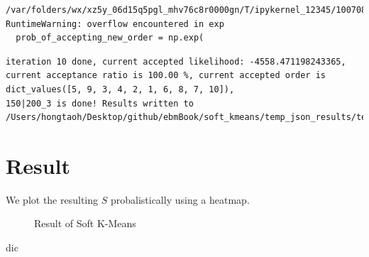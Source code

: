 \documentclass[
  letterpaper,
  DIV=11,
  numbers=noendperiod]{scrreprt}
\newenvironment{Shaded}{\begin{snugshade}}{\end{snugshade}}
\newcommand{\NormalTok}[1]{\textcolor[rgb]{0.00,0.23,0.31}{#1}}
\begin{document}
\begin{verbatim}
/var/folders/wx/xz5y_06d15q5pgl_mhv76c8r0000gn/T/ipykernel_12345/1007084789.py:261: RuntimeWarning: overflow encountered in exp
  prob_of_accepting_new_order = np.exp(
\end{verbatim}

\begin{verbatim}
iteration 10 done, current accepted likelihood: -4558.471198243365, current acceptance ratio is 100.00 %, current accepted order is dict_values([5, 9, 3, 4, 2, 1, 6, 8, 7, 10]), 
150|200_3 is done! Results written to /Users/hongtaoh/Desktop/github/ebmBook/soft_kmeans/temp_json_results/temp_results_200_0.75_3.json
\end{verbatim}

\section{Result}\label{result-2}

We plot the resulting \(S\) probalistically using a heatmap.

\begin{figure}


\caption{\label{fig-soft-kmeans-result}Result of Soft K-Means}

\end{figure}%

\begin{Shaded}
\begin{Highlighting}[]
\NormalTok{dic}
\end{Highlighting}
\end{Shaded}
\end{document}
